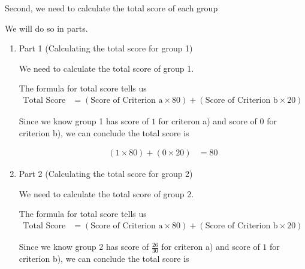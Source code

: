 \documentclass[12pt]{article}
\begin{document}
\begin{mdframed}
\begin{itemize}
        \bigskip

        Second, we need to calculate the total score of each group

        \bigskip

        We will do so in parts.


        \begin{enumerate}[1.]
            \item Part 1 (Calculating the total score for group 1)

            \begin{mdframed}
                We need to calculate the total score of group 1.

                \bigskip

                The formula for total score tells us
                \setcounter{equation}{0}
                \begin{align}
                    \text{Total Score} &= (\text{Score of Criterion a} \times 80) + (\text{Score of Criterion b} \times 20)
                \end{align}

                \bigskip

                Since we know group 1 has score of $1$ for criteron a) and score of $0$ for
                criterion b), we can conclude the total score is

                \begin{align}
                    (1 \times 80) + (0 \times 20) &= 80
                \end{align}
            \end{mdframed}

            \item Part 2 (Calculating the total score for group 2)

            \begin{mdframed}
                We need to calculate the total score of group 2.

                \bigskip

                The formula for total score tells us
                \setcounter{equation}{0}
                \begin{align}
                    \text{Total Score} &= (\text{Score of Criterion a} \times 80) + (\text{Score of Criterion b} \times 20)
                \end{align}

                \bigskip

                Since we know group 2 has score of $\frac{26}{30}$ for criteron a) and score of $1$ for
                criterion b), we can conclude the total score is


\end{mdframed}
\end{enumerate}
\end{itemize}
\end{mdframed}
\end{document}
